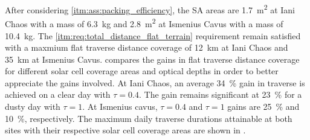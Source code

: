 After considering \ref{itm:ass:packing_efficiency}, the \ac{SA} areas are \SI{1.7}{m^{2}} at Iani Chaos with a mass of \SI{6.3}{\kilo\gram} and \SI{2.8}{m^{2}} at Ismenius Cavus with a mass of \SI{10.4}{\kilo\gram}. The \ref{itm:req:total_distance_flat_terrain} requirement remain satisfied with
a maxmium flat traverse distance coverage of \SI{12}{\kilo\meter} at Iani Chaos and \SI{35}{\kilo\meter} at Ismenius Cavus.  compares the gains in flat traverse distance coverage for different solar cell coverage areas and optical depths in order to better appreciate the gains involved. At Iani Chaos, an average \SI{34}{\percent} gain in traverse is achieved on a clear day with $\tau = 0.4$. The gain remains significant at \SI{23}{\percent} for a dusty day with $\tau = 1$. At Ismenius cavus, $\tau = 0.4$ and $\tau = 1$ gains are \SI{25}{\percent} and \SI{10}{\percent}, respectively. The maximum daily traverse durations attainable at both sites with their respective solar cell coverage areas are shown in .

